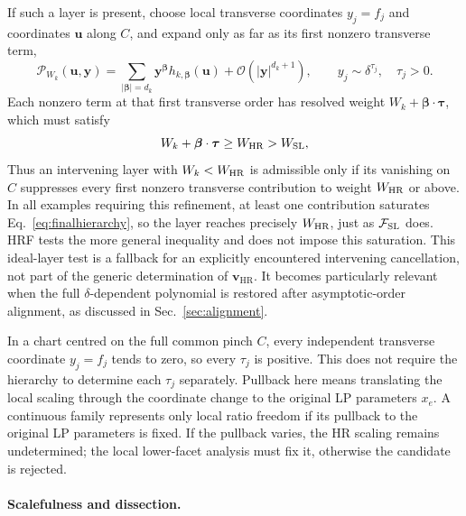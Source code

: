 \documentclass[a4paper,11pt]{article}
\newcommand{\HR}{\mathrm{HR}}
\newcommand{\FSL}{\mathcal F_{\rm SL}}
\newcommand{\WSL}{W_{\rm SL}}
\newcommand{\WHR}{W_{\rm HR}}
\begin{document}
If such a layer is present, choose local transverse coordinates \(y_j=f_j\)
and coordinates \(\boldsymbol u\) along \(C\), and expand only as far as its
first nonzero transverse term,
\begin{equation}
 \mathcal P_{W_k}(\boldsymbol u,\boldsymbol y)
 =\sum_{|\boldsymbol\beta|=d_k}
   \boldsymbol y^{\boldsymbol\beta}
   h_{k,\boldsymbol\beta}(\boldsymbol u)
   +\mathcal O(|\boldsymbol y|^{d_k+1}),
 \qquad
 y_j\sim\delta^{\tau_j},\quad \tau_j>0.
\label{eq:exceptional-layer-expansion}
\end{equation}
Each nonzero term at that first transverse order has resolved weight
\(W_k+\boldsymbol\beta\cdot\boldsymbol\tau\), which must satisfy
\begin{equation}
 W_k+\boldsymbol\beta\cdot\boldsymbol\tau
 \geq\WHR>\WSL,
\label{eq:finalhierarchy}
\end{equation}
Thus an intervening layer with \(W_k<\WHR\) is admissible only if its
vanishing on \(C\) suppresses every first nonzero transverse contribution to
weight \(\WHR\) or above.  In all examples requiring this refinement, at
least one contribution saturates Eq.~\eqref{eq:finalhierarchy}, so the layer
reaches precisely \(\WHR\), just as \(\FSL\) does.  HRF tests the more general
inequality and does not impose this saturation.  This ideal-layer test is a
fallback for an explicitly encountered intervening cancellation, not part
of the generic determination of \(\boldsymbol v_{\HR}\).  It becomes
particularly relevant when the full \(\delta\)-dependent polynomial is
restored after asymptotic-order alignment, as discussed in
Sec.~\ref{sec:alignment}.

In a chart centred on the full common pinch \(C\), every independent
transverse coordinate \(y_j=f_j\) tends to zero, so every \(\tau_j\) is
positive.  This does not require the hierarchy to determine each
\(\tau_j\) separately.  Pullback here means translating the local scaling
through the coordinate change to the original LP parameters \(x_e\).  A
continuous family represents only local ratio
freedom if its pullback to the original LP parameters is fixed.  If the
pullback varies, the HR scaling remains undetermined; the local lower-facet
analysis must fix it, otherwise the candidate is rejected.

\paragraph{Scalefulness and dissection.}
\label{sec:scaleful}
\end{document}

